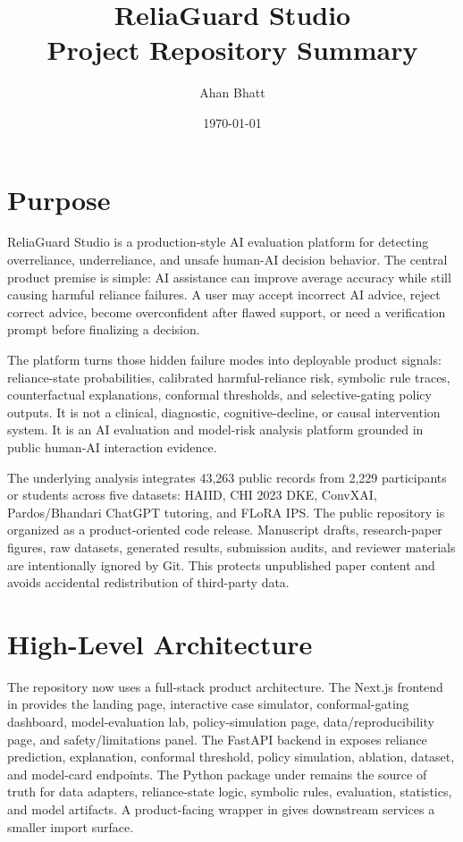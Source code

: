\documentclass[11pt]{article}
\title{ReliaGuard Studio\\Project Repository Summary}
\author{Ahan Bhatt}
\date{\today}
\begin{document}
\maketitle

\section*{Purpose}

ReliaGuard Studio is a production-style AI evaluation platform for detecting overreliance, underreliance, and unsafe human-AI decision behavior. The central product premise is simple: AI assistance can improve average accuracy while still causing harmful reliance failures. A user may accept incorrect AI advice, reject correct advice, become overconfident after flawed support, or need a verification prompt before finalizing a decision.

The platform turns those hidden failure modes into deployable product signals: reliance-state probabilities, calibrated harmful-reliance risk, symbolic rule traces, counterfactual explanations, conformal thresholds, and selective-gating policy outputs. It is not a clinical, diagnostic, cognitive-decline, or causal intervention system. It is an AI evaluation and model-risk analysis platform grounded in public human-AI interaction evidence.

The underlying analysis integrates 43,263 public records from 2,229 participants or students across five datasets: HAIID, CHI 2023 DKE, ConvXAI, Pardos/Bhandari ChatGPT tutoring, and FLoRA IPS. The public repository is organized as a product-oriented code release. Manuscript drafts, research-paper figures, raw datasets, generated results, submission audits, and reviewer materials are intentionally ignored by Git. This protects unpublished paper content and avoids accidental redistribution of third-party data.

\section*{High-Level Architecture}

The repository now uses a full-stack product architecture. The Next.js frontend in  provides the landing page, interactive case simulator, conformal-gating dashboard, model-evaluation lab, policy-simulation page, data/reproducibility page, and safety/limitations panel. The FastAPI backend in  exposes reliance prediction, explanation, conformal threshold, policy simulation, ablation, dataset, and model-card endpoints. The Python package under  remains the source of truth for data adapters, reliance-state logic, symbolic rules, evaluation, statistics, and model artifacts. A product-facing wrapper in  gives downstream services a smaller import surface.
\end{document}
